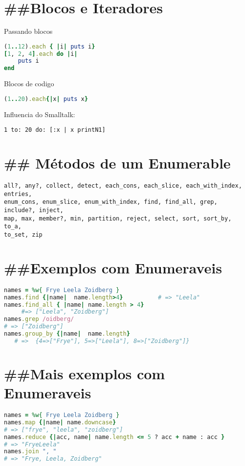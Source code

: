 \documentclass[serif,mathserif]{article}
\begin{document}
\section{\#\#Blocos e Iteradores}

Passando blocos
\begin{lstlisting}[language=ruby]
(1..12).each { |i| puts i}
[1, 2, 4].each do |i|
    puts i
end
\end{lstlisting}

Blocos de codigo
\begin{lstlisting}[language=ruby]
(1..20).each{|x| puts x}
\end{lstlisting}

Influencia do Smalltalk:
\begin{lstlisting}[language=smalltalk]
   1 to: 20 do: [:x | x printN1]
\end{lstlisting}

\section{\#\# Métodos de um Enumerable}
\begin{lstlisting}  
all?, any?, collect, detect, each_cons, each_slice, each_with_index, entries,
enum_cons, enum_slice, enum_with_index, find, find_all, grep, include?, inject,
map, max, member?, min, partition, reject, select, sort, sort_by, to_a,
to_set, zip
\end{lstlisting}
 
\section{\#\#Exemplos com Enumeraveis}
\begin{lstlisting}[language=ruby]
names = %w{ Frye Leela Zoidberg }
names.find {|name|  name.length>4}          # => "Leela"
names.find_all { |name| name.length > 4}
     #=> ["Leela", "Zoidberg"]
names.grep /oidberg/
# => ["Zoidberg"]
names.group_by {|name|  name.length}
   # =>  {4=>["Frye"], 5=>["Leela"], 8=>["Zoidberg"]}
\end{lstlisting}

\section{\#\#Mais exemplos com Enumeraveis}
\begin{lstlisting}[language=ruby]
names = %w{ Frye Leela Zoidberg }
names.map {|name| name.downcase}
# => ["frye", "leela", "zoidberg"]
names.reduce {|acc, name| name.length <= 5 ? acc + name : acc }
# => "FryeLeela"
names.join ", "
# => "Frye, Leela, Zoidberg"
\end{lstlisting}
\end{document}
